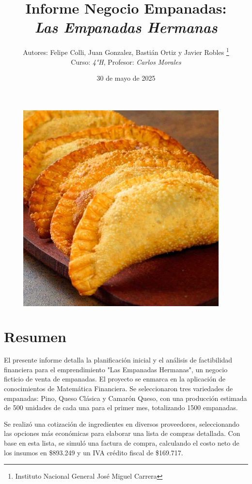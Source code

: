 \documentclass[12pt]{article}
\title{Informe Negocio Empanadas: \\
\textit{Las Empanadas Hermanas}} %
\author{Autores: Felipe Colli, Juan Gonzalez, Bastián Ortiz y Javier Robles \thanks{Instituto Nacional General José Miguel Carrera} \\
  Curso: \textit{4°H}, Profesor: \textit{Carlos Morales}} %
\date{30 de mayo de 2025} %
\begin{document}
\maketitle
\begin{figure}[h]
    \centering
    \includegraphics[width=0.95\textwidth]{empanadas} %
\end{figure}
\newpage

\tableofcontents
\newpage

\section{Resumen} %
El presente informe detalla la planificación inicial y el análisis de factibilidad financiera para el emprendimiento "Las Empanadas Hermanas", un negocio ficticio de venta de empanadas. El proyecto se enmarca en la aplicación de conocimientos de Matemática Financiera. Se seleccionaron tres variedades de empanadas: Pino, Queso Clásica y Camarón Queso, con una producción estimada de 500 unidades de cada una para el primer mes, totalizando 1500 empanadas.

Se realizó una cotización de ingredientes en diversos proveedores, seleccionando las opciones más económicas para elaborar una lista de compras detallada. Con base en esta lista, se simuló una factura de compra, calculando el costo neto de los insumos en \$893.249 y un IVA crédito fiscal de \$169.717.
\end{document}

